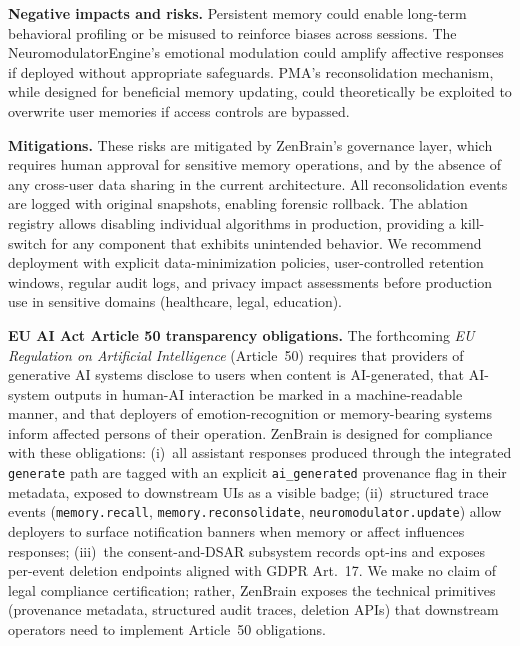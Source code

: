 \documentclass{article}
\begin{document}
\textbf{Negative impacts and risks.}
Persistent memory could enable long-term behavioral profiling or be
misused to reinforce biases across sessions.
The NeuromodulatorEngine's emotional modulation could amplify affective
responses if deployed without appropriate safeguards.
PMA's reconsolidation mechanism, while designed for beneficial memory
updating, could theoretically be exploited to overwrite user memories
if access controls are bypassed.

\textbf{Mitigations.}
These risks are mitigated by ZenBrain's governance layer, which
requires human approval for sensitive memory operations, and by the
absence of any cross-user data sharing in the current architecture.
All reconsolidation events are logged with original snapshots, enabling
forensic rollback.
The ablation registry allows disabling individual algorithms in
production, providing a kill-switch for any component that exhibits
unintended behavior.
We recommend deployment with explicit data-minimization policies,
user-controlled retention windows, regular audit logs, and privacy
impact assessments before production use in sensitive domains
(healthcare, legal, education).

\textbf{EU AI Act Article 50 transparency obligations.}
The forthcoming \emph{EU Regulation on Artificial Intelligence}
(Article~50) requires that providers of generative AI systems disclose
to users when content is AI-generated, that AI-system outputs in
human-AI interaction be marked in a machine-readable manner, and that
deployers of emotion-recognition or memory-bearing systems inform
affected persons of their operation.
ZenBrain is designed for compliance with these obligations:
(i)~all assistant responses produced through the integrated
\texttt{generate} path are tagged with an explicit \texttt{ai\_generated}
provenance flag in their metadata, exposed to downstream UIs as a
visible badge;
(ii)~structured trace events (\texttt{memory.recall},
\texttt{memory.reconsolidate}, \texttt{neuromodulator.update}) allow
deployers to surface notification banners when memory or affect
influences responses;
(iii)~the consent-and-DSAR subsystem records opt-ins and exposes
per-event deletion endpoints aligned with GDPR Art.~17.
We make no claim of legal compliance certification; rather, ZenBrain
exposes the technical primitives (provenance metadata, structured
audit traces, deletion APIs) that downstream operators need to
implement Article~50 obligations.


\end{document}
